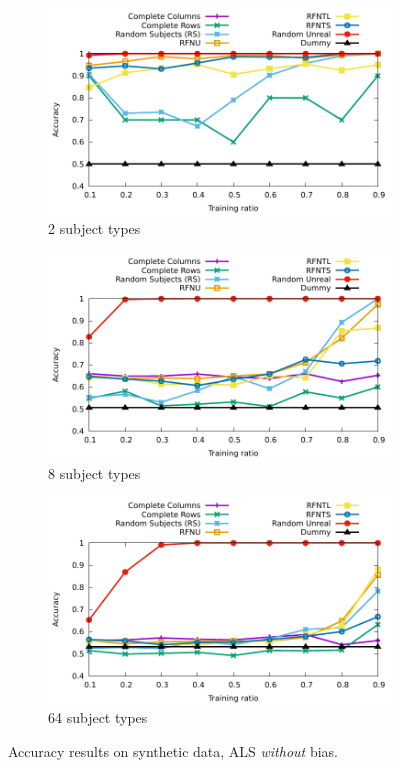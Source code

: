 \documentclass[10pt, conference, compsocconf]{IEEEtran}
\begin{document}
\begin{figure}
\begin{subfigure}[b]{0.3\textwidth}
        \includegraphics[width=\textwidth]{data/results/means_of_results/ALS/Synthetic/synthetic_subject_types/ALS-2-types.pdf}
        \caption{2 subject types}
\end{subfigure}
\hfill
\begin{subfigure}[b]{0.3\textwidth}
        \includegraphics[width=\textwidth]{data/results/means_of_results/ALS/Synthetic/synthetic_subject_types/ALS-8-types.pdf}
        \caption{8 subject types}
\end{subfigure}
\hfill
\begin{subfigure}[b]{0.3\textwidth}
        \includegraphics[width=\textwidth]{data/results/means_of_results/ALS/Synthetic/synthetic_subject_types/ALS-64-types.pdf}
        \caption{64 subject types}
\end{subfigure}
\caption{Accuracy results on synthetic data, ALS \emph{without} bias.}
\label{fig:results-synthetic}
\end{figure}
\end{document}
